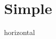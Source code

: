 \documentclass{article}
\begin{document}
\section{Simple}


\begin{stack}{horizontal}
\end{stack}
\end{document}
